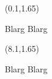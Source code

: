 \documentclass{beamer}
\begin{document}
\begin{textblock}{7.6}(0.1,1.65)
  \begin{block}{Blarg}
    Blarg
  \end{block}
\end{textblock}
\begin{textblock}{7.6}(8.1,1.65)
  \begin{block}{Blarg}
    Blarg
  \end{block}  
\end{textblock}
\end{document}
